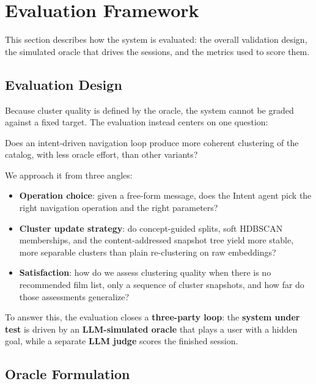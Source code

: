 \section{Evaluation Framework}\label{sec:evaluation}

This section describes how the system is evaluated: the overall validation design, the simulated
oracle that drives the sessions, and the metrics used to score them.

\subsection{Evaluation Design}

Because cluster quality is defined by the oracle, the system cannot be graded against a fixed target.
The evaluation instead centers on one question:
\begin{center}
\itshape
\begin{minipage}{0.82\columnwidth}
\centering
Does an intent-driven navigation loop produce more coherent clustering of the catalog, with less oracle effort, than other variants?
\end{minipage}
\end{center}
We approach it from three angles:
\begin{itemize}[leftmargin=1.4em]
  \item \textbf{Operation choice}: given a free-form message, does the Intent agent pick the right navigation operation and the right parameters?
  \item \textbf{Cluster update strategy}: do concept-guided splits, soft HDBSCAN memberships, and the content-addressed snapshot tree yield more stable, more separable clusters than plain re-clustering on raw embeddings?
  \item \textbf{Satisfaction}: how do we assess clustering quality when there is no recommended film list, only a sequence of cluster snapshots, and how far do those assessments generalize?
\end{itemize}

To answer this, the evaluation closes a \textbf{three-party loop}: the \textbf{system under test} is driven by an \textbf{LLM-simulated oracle} that plays a user with a hidden goal, while a separate \textbf{LLM judge} scores the finished session.

\subsection{Oracle Formulation}

